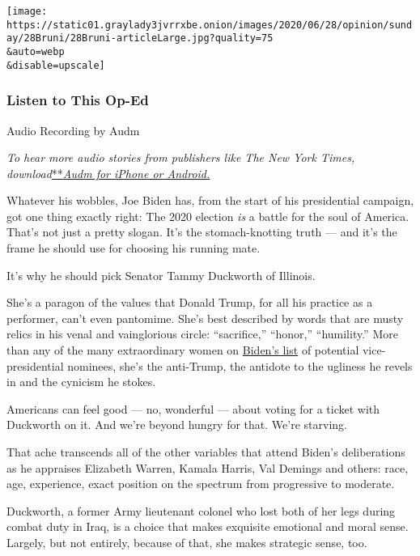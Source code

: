 \texttt{[image: https://static01.graylady3jvrrxbe.onion/images/2020/06/28/opinion/sunday/28Bruni/28Bruni-articleLarge.jpg?quality=75\\\&auto=webp\\\&disable=upscale]}

\hypertarget{listen-to-this-op-ed}{%
\subsubsection{Listen to This Op-Ed}\label{listen-to-this-op-ed}}

Audio Recording by Audm

\emph{To hear more audio stories from publishers like The New York
Times,
download}\href{https://www.audm.com/?utm_source=nytmag\&utm_medium=embed\&utm_campaign=left_behind_draper}{**}\href{https://www.audm.com/?utm_source=nytopinion\&utm_medium=embed\&utm_campaign=biden_best_veep}{\emph{Audm
for iPhone or Android.}}

Whatever his wobbles, Joe Biden has, from the start of his presidential
campaign, got one thing exactly right: The 2020 election \emph{is} a
battle for the soul of America. That's not just a pretty slogan. It's
the stomach-knotting truth --- and it's the frame he should use for
choosing his running mate.

It's why he should pick Senator Tammy Duckworth of Illinois.

She's a paragon of the values that Donald Trump, for all his practice as
a performer, can't even pantomime. She's best described by words that
are musty relics in his venal and vainglorious circle: ``sacrifice,''
``honor,'' ``humility.'' More than any of the many extraordinary women
on
\href{https://www.nytimes3xbfgragh.onion/article/biden-vice-president-2020.html}{Biden's
list} of potential vice-presidential nominees, she's the anti-Trump, the
antidote to the ugliness he revels in and the cynicism he stokes.

Americans can feel good --- no, wonderful --- about voting for a ticket
with Duckworth on it. And we're beyond hungry for that. We're starving.

That ache transcends all of the other variables that attend Biden's
deliberations as he appraises Elizabeth Warren, Kamala Harris, Val
Demings and others: race, age, experience, exact position on the
spectrum from progressive to moderate.

Duckworth, a former Army lieutenant colonel who lost both of her legs
during combat duty in Iraq, is a choice that makes exquisite emotional
and moral sense. Largely, but not entirely, because of that, she makes
strategic sense, too.

